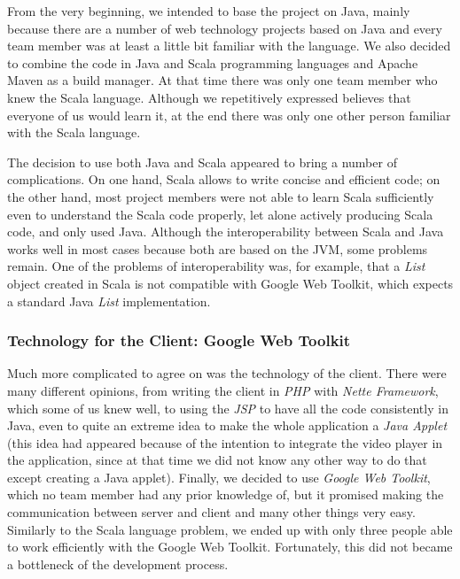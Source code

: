 From the very beginning, we intended to base the project on Java, mainly because there are a number of web technology projects based on Java and
 every team member was at least a little bit familiar with the language. 
We also decided to combine the code in Java and Scala programming 
languages and Apache Maven as a build manager. At that time there was 
only one team member who knew the Scala language. Although we 
repetitively expressed believes that everyone of us would learn it, at 
the end there was only one other person familiar with the Scala language.

The decision to use both Java and Scala appeared to bring a number of 
complications. On one hand, Scala allows to write concise and efficient 
code; on the other hand, most project members were not able to learn 
Scala sufficiently even to understand the Scala code properly, let alone 
actively producing Scala code, and only used Java.
Although the interoperability between Scala and Java works well in most 
cases because both are based on the JVM, some problems remain. One of the 
problems of interoperability was, for example, that a \emph{List} object 
created in Scala is not compatible with Google Web Toolkit, which expects 
a standard Java \emph{List} implementation.

\subsubsection{Technology for the Client: Google Web Toolkit}
\label{subsubsec:implementation:gwt}

Much more complicated to agree on was the technology of the client. There were many different opinions, from writing the client in {\it PHP} with {\it Nette Framework}, which some of us knew well, to using the {\it JSP} to have all the code consistently in Java, even to quite an extreme idea to make the whole application a {\it Java Applet} (this idea had appeared because of the intention to integrate the video player in the application, since at that time we did not know any other way to do that except creating a Java applet). Finally, we decided to use {\it Google Web Toolkit}, which no team member had any prior knowledge of, but it promised making the communication between server and client and many other things very easy. Similarly to the Scala language problem, we ended up with only three people able to work efficiently with the Google Web Toolkit. Fortunately, this did not became a bottleneck of the development process.

